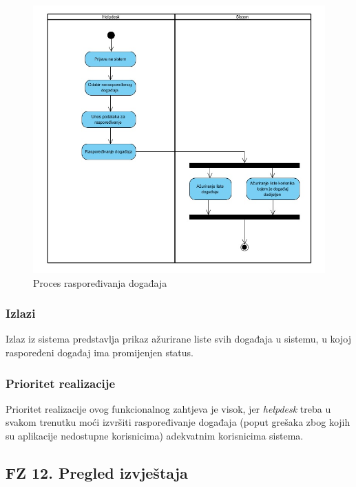 \documentclass[12pt,a4paper]{article}
\begin{document}
\begin{figure}[H]
\center
\includegraphics[scale=0.5]{../res/Activity/activity11.JPG}
\caption{Proces raspoređivanja događaja}
\label{act11}
\end{figure}

\subsubsection{Izlazi}

Izlaz iz sistema predstavlja prikaz ažurirane liste svih događaja u sistemu, u kojoj raspoređeni događaj ima promijenjen status.

\subsubsection{Prioritet realizacije}

Prioritet realizacije ovog funkcionalnog zahtjeva je visok, jer \textit{helpdesk} treba u svakom trenutku moći izvršiti raspoređivanje događaja (poput grešaka zbog kojih su aplikacije nedostupne korisnicima) adekvatnim korisnicima sistema.

\newpage

\subsection{FZ 12. Pregled izvještaja}
\end{document}
